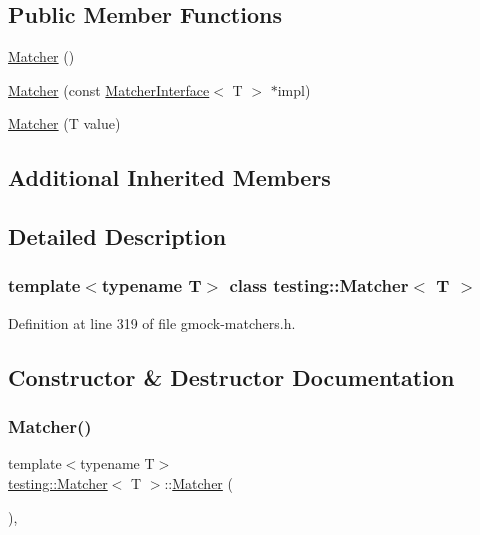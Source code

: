 \subsection*{Public Member Functions}
\begin{DoxyCompactItemize}
\item 
\hyperlink{classtesting_1_1Matcher_a57bfc9e62d7f6acfee5ad88d1077931c}{Matcher} ()
\item 
\hyperlink{classtesting_1_1Matcher_aea32eb3f86233853de91929fb2691bf3}{Matcher} (const \hyperlink{classtesting_1_1MatcherInterface}{Matcher\+Interface}$<$ T $>$ $\ast$impl)
\item 
\hyperlink{classtesting_1_1Matcher_adc75e0bd47ffc75ba8a5f760372d0493}{Matcher} (T value)
\end{DoxyCompactItemize}
\subsection*{Additional Inherited Members}


\subsection{Detailed Description}
\subsubsection*{template$<$typename T$>$\newline
class testing\+::\+Matcher$<$ T $>$}



Definition at line 319 of file gmock-\/matchers.\+h.



\subsection{Constructor \& Destructor Documentation}
\mbox{\label{classtesting_1_1Matcher_a57bfc9e62d7f6acfee5ad88d1077931c}} 
\subsubsection{\texorpdfstring{Matcher()}{Matcher()}\hspace{0.1cm}{\footnotesize\ttfamily [1/3]}}
{\footnotesize\ttfamily template$<$typename T$>$ \\
\hyperlink{classtesting_1_1Matcher}{testing\+::\+Matcher}$<$ T $>$\+::\hyperlink{classtesting_1_1Matcher}{Matcher} (\begin{DoxyParamCaption}{ }\end{DoxyParamCaption})\hspace{0.3cm}{\ttfamily [inline]}, {\ttfamily [explicit]}}




